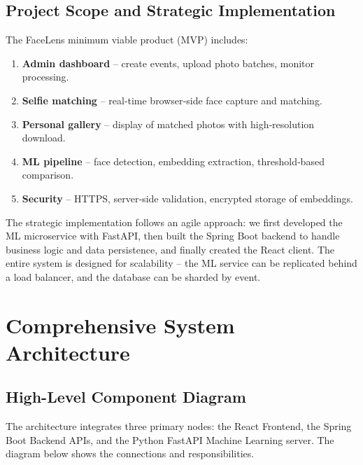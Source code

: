 \documentclass[12pt,a4paper]{article}
\begin{document}
\subsection{Project Scope and Strategic Implementation}
The FaceLens minimum viable product (MVP) includes:
\begin{enumerate}
    \item \textbf{Admin dashboard} – create events, upload photo batches, monitor processing.
    \item \textbf{Selfie matching} – real‑time browser‑side face capture and matching.
    \item \textbf{Personal gallery} – display of matched photos with high‑resolution download.
    \item \textbf{ML pipeline} – face detection, embedding extraction, threshold‑based comparison.
    \item \textbf{Security} – HTTPS, server‑side validation, encrypted storage of embeddings.
\end{enumerate}

The strategic implementation follows an agile approach: we first developed the ML microservice with FastAPI, then built the Spring Boot backend to handle business logic and data persistence, and finally created the React client. The entire system is designed for scalability – the ML service can be replicated behind a load balancer, and the database can be sharded by event.

\newpage

\section{Comprehensive System Architecture}

\subsection{High-Level Component Diagram}
The architecture integrates three primary nodes: the React Frontend, the Spring Boot Backend APIs, and the Python FastAPI Machine Learning server. The diagram below shows the connections and responsibilities.
\end{document}
